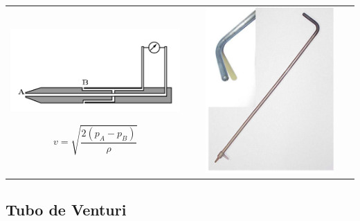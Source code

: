 \begin{tabular}{cc}
	\begin{minipage}[c]{0.4\textwidth}%
		\begin{center}
			\includegraphics[width=0.7\linewidth]{TeX_files/chapter04-Dinamica/pitot2}
		\end{center}
		
		\[
		v=\sqrt{\frac{2(p_{A}-p_{B})}{\rho}}
		\]
	\end{minipage} & %
	\begin{minipage}[c]{0.4\textwidth}%
		\includegraphics[clip,width=0.8\textwidth,angle=270]{TeX_files/chapter04-Dinamica/prandtl} %
	\end{minipage}\tabularnewline
\end{tabular}
\subsection{Tubo de Venturi}
	
